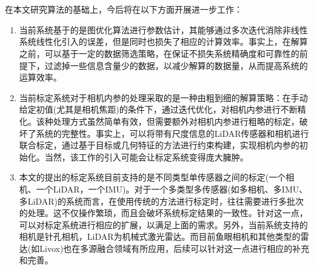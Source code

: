 \section{}
在本文研究算法的基础上，今后将在以下方面开展进一步工作：
\begin{enumerate}
  \item 当前系统基于的是图优化算法进行参数估计，其能够通过多次迭代消除非线性系统线性化引入的误差，但是同时也损失了相应的计算效率。事实上，在解算之前，可以基于一定的数据筛选策略，在保证不损失系统精确度和可靠性的前提下，过滤掉一些信息含量少的数据，以减少解算的数据量，从而提高系统的运算效率\cite{lv2022observability}。

  \item 当前标定系统对于相机内参的处理采取的是一种由粗到细的解算策略：在手动给定初值(尤其是相机焦距)的条件下，通过迭代优化，对相机内参进行不断精化。该种处理方式虽然简单有效，但需要额外对相机内参进行粗略的标定，破坏了系统的完整性。事实上，可以将带有尺度信息的LiDAR传感器和相机进行联合标定，通过基于目标或几何特征的方法进行约束构建，实现相机内参的初始化。当然，该工作的引入可能会让标定系统变得庞大臃肿。

  \item 本文的提出的标定系统目前支持的是不同类型单传感器之间的标定(一个相机、一个LiDAR，一个IMU)。对于一个多类型多传感器(如多相机、多IMU、多LiDAR)的系统而言，在使用传统的方法进行标定时，往往需要进行多批次的处理。这不仅操作繁琐，而且会破坏系统标定结果的一致性。针对这一点，可以对标定系统进行相应的扩展，以满足上面的需求。另外，当前系统支持的相机是针孔相机，LiDAR为机械式激光雷达。而目前鱼眼相机和其他类型的雷达(如Livox)也在多源融合领域有所应用，后续可以针对这一点进行相应的补充和完善。

\end{enumerate}

\newpage
\appendix

